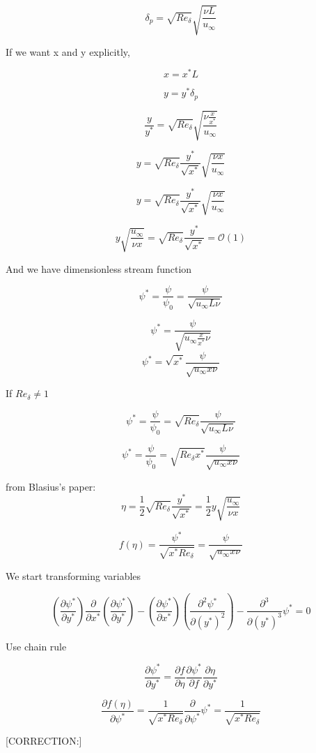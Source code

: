 \documentclass[11pt]{article}
\begin{document}
$$\delta_p  = \sqrt{Re_\delta} \sqrt{\frac{\nu L}{u_\infty}}$$

If we want x and y explicitly, 

$$x = x^* L$$

$$y=y^* \delta_p$$

$$ \frac{y}{y^*} = \sqrt{Re_\delta} \sqrt{\frac{\nu \frac{x}{x^*}}{u_\infty}}$$

$$ y = \sqrt{Re_\delta} \frac{y^*}{\sqrt{x^*}} \sqrt{\frac{\nu x}{u_\infty}}$$

$$ y = \sqrt{Re_\delta} \frac{y^*}{\sqrt{x^*}} \sqrt{\frac{\nu x}{u_\infty}}$$

$$y \sqrt{\frac{u_\infty}{\nu x}} = \sqrt{Re_\delta} \frac{y^*}{\sqrt{x^*}} = \mathcal{O}(1)$$

And we have dimensionless stream function

$$\psi^* = \frac{\psi}{\psi_0} = \frac{\psi}{\sqrt{u_\infty L \nu }} $$


$$\psi^* = \frac{\psi}{\sqrt{u_\infty \frac{x}{x^*} \nu }} $$
$$\psi^* = \sqrt{x^*}\frac{\psi}{\sqrt{u_\infty x \nu }} $$

If $Re_{\delta} \neq 1$

$$\psi^* = \frac{\psi}{\psi_0} = \sqrt{Re_\delta} \frac{\psi}{\sqrt{u_\infty L \nu }} $$

$$\psi^* = \frac{\psi}{\psi_0} = \sqrt{Re_\delta x^*} \frac{\psi}{\sqrt{u_\infty x \nu }} $$


from Blasius's paper:
$$\eta = \frac{1}{2} \sqrt{Re_\delta} \frac{y^*}{\sqrt{x^*}} = \frac{1}{2}y \sqrt{\frac{u_\infty}{\nu x}} $$

$$f(\eta) = \frac{\psi^*}{\sqrt{x^* Re_\delta}} = \frac{\psi}{\sqrt{u_\infty x \nu}}$$

We start transforming variables

$$  (\frac{\partial \psi^*}{\partial y^*})  \frac{\partial}{\partial x^* } (\frac{\partial \psi^*}{\partial y^*}) - (\frac{\partial \psi^*}{\partial x^*})  (\frac{\partial^2 \psi^*}{\partial (y^*)^2}) - \frac{\partial^3}{\partial (y^*)^3} \psi^*  =  0$$


Use chain rule

$$ \frac{\partial \psi^* }{\partial y^*} = \frac{\partial f}{\partial \eta} \frac{\partial \psi^*}{\partial f} \frac{\partial \eta}{\partial y^*} $$

$$\frac{\partial f(\eta)}{\partial \psi^*}  = \frac{1}{\sqrt{x^* Re_\delta}} \frac{\partial}{\partial \psi^*} \psi^*  = \frac{1}{\sqrt{x^* Re_\delta}}$$

[CORRECTION:]
\end{document}
